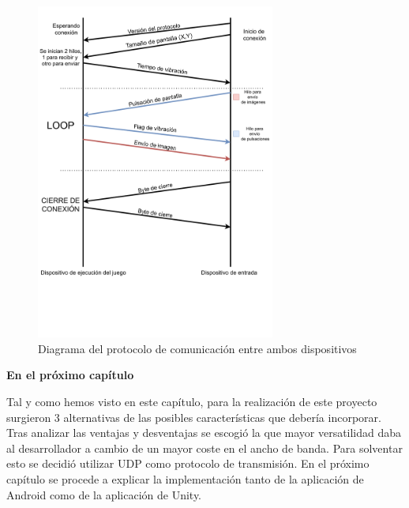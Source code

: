 \begin{figure}[h]

\centering
\includegraphics[width=0.7\textwidth]{./Imagenes/Vectorial/Arquitectura}
\caption{Diagrama del protocolo de comunicaci\'on entre ambos dispositivos}
\end{figure}

\bigskip
\Large{\textbf{En el pr\'oximo cap\'itulo}}\\
\normalsize

\addvspace{1cm}


Tal y como hemos visto en este cap\'itulo, para la realizaci\'on de este proyecto surgieron 3 alternativas de las posibles caracter\'isticas que deber\'ia incorporar. Tras analizar las ventajas y desventajas se escogi\'o la que mayor versatilidad daba al desarrollador a cambio de un mayor coste en el ancho de banda. Para solventar esto se decidi\'o utilizar UDP como protocolo de transmisi\'on. En el pr\'oximo cap\'itulo se procede a explicar la implementaci\'on tanto de la aplicaci\'on de Android como de  la aplicaci\'on de Unity. 


